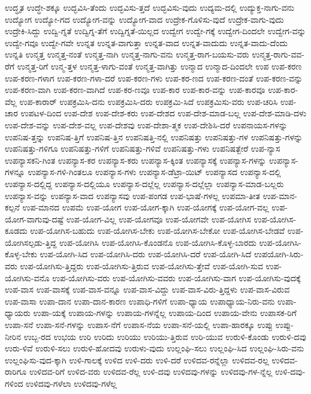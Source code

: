 {ಉದ್ಧೃತ
ಉದ್ಧೇ-ಶಕ್ಕೂ
ಉದ್ಭವಿಸಿ-ತೆಂದು
ಉದ್ಭವಿಸು-ತ್ತದೆ
ಉದ್ಭವಿಸು-ವುದು
ಉದ್ಯಮ-ದಲ್ಲಿ
ಉದ್ಯುಕ್ತ-ನಾಗು-ವನು
ಉದ್ಯೋಗ
ಉದ್ಯೋ-ಗದ
ಉದ್ಯೋಗ-ವನ್ನು
ಉದ್ಯೋಗ-ವಾದ
ಉದ್ರೇಕ-ಗೊಳಿಸು-ವುದೆ
ಉದ್ರೇಕ-ವಾಗು-ವುದು
ಉದ್ರೇಕಿ-ಸಿದ್ದು
ಉದ್ವಿ-ಗ್ನತೆ
ಉದ್ವಿಗ್ನ-ತೆಗೆ
ಉದ್ವಿಗ್ನತೆ-ಯಿಲ್ಲದ
ಉದ್ವೇಗ
ಉದ್ವೇ-ಗಕ್ಕೆ
ಉದ್ವೇಗ-ದಿಂದಲೇ
ಉದ್ವೇಗ-ವನ್ನು
ಉದ್ವೇ-ಗವೂ
ಉದ್ವೇ-ಗವೇ
ಉನ್ನತ
ಉನ್ನತ-ವಾಗುತ್ತಾ
ಉನ್ನತ-ವಾದ
ಉನ್ನತ-ವಾದುದು
ಉನ್ನತ-ವಾದು-ದೆಂದು
ಉನ್ನತಿ
ಉನ್ಮತ್ತ
ಉನ್ಮತ್ತ-ನಂತೆ
ಉನ್ಮತ್ತ-ನಾಗಿ
ಉನ್ಮತ್ತ-ನಾಗು-ವನು
ಉನ್ಮತ್ತ-ರಾಗ-ಬಯಸು-ವರು
ಉನ್ಮತ್ತ-ರಾಗು-ವವ-ರೆಗೆ
ಉನ್ಮತ್ತ-ರಿಗೆ
ಉನ್ಮ-ತ್ತಳ
ಉನ್ಮತ್ತ-ಳಾಗು-ವಂತೆ
ಉನ್ಮತ್ತ-ವಾಗಿತ್ತು
ಉನ್ಮಾದ
ಉನ್ಮಾದ-ದಿಂದಲೇ
ಉಪ
ಉಪ-ಕರಣ
ಉಪ-ಕರಣ-ಗಳಾಗ
ಉಪ-ಕರಣ-ಗಳಾ-ದರೆ
ಉಪ-ಕರಣ-ಗಳು
ಉಪ-ಕರ-ಣದ
ಉಪ-ಕರಣ-ದಂತೆ
ಉಪ-ಕರಣ-ವನ್ನು
ಉಪ-ಕರಣ-ವಾಗಿ
ಉಪ-ಕರಣ-ವಾಗಿದೆ
ಉಪ-ಕರ-ಣವೂ
ಉಪ-ಕಾರ
ಉಪ-ಕಾರ-ವನ್ನು
ಉಪ-ಕಾರವೂ
ಉಪ-ಕಾರ-ವೆಲ್ಲ
ಉಪ-ಕಾರಾರ್
ಉಪಕ್ರಮಿಸಿ-ದನು
ಉಪಕ್ರಮಿಸಿ-ದರು
ಉಪಕ್ರಮಿ-ಸಿದೆ
ಉಪಕ್ರಮಿಸು-ವರು
ಉಪ-ಚರಿಸಿ
ಉಪ-ಚಾರ
ಉಪಟಳ-ದಿಂದ
ಉಪ-ದೇಶ
ಉಪ-ದೇಶ-ಕರು
ಉಪ-ದೇಶದ
ಉಪ-ದೇಶ-ಮಾಡ-ಬಲ್ಲ
ಉಪ-ದೇಶ-ಮಾಡಿ-ದಳು
ಉಪ-ದೇಶ-ವನ್ನು
ಉಪ-ದೇಶ-ವಲ್ಲ
ಉಪ-ದೇಶವು
ಉಪ-ದೇಶಾ-ತ್ಮಕ
ಉಪ-ದೇಶಿಸಿ-ದರೆ
ಉಪನಾಯಸ-ಗಳನ್ನು
ಉಪನಿಷ-ತ್ತನ್ನು
ಉಪನಿಷ-ತ್ತಿಗೆ
ಉಪನಿಷ-ತ್ತಿನ
ಉಪನಿಷತ್ತಿ-ನಲ್ಲಿ
ಉಪನಿಷತ್ತು
ಉಪನಿಷತ್ತು-ಗಳ
ಉಪನಿಷತ್ತು-ಗಳನ್ನು
ಉಪನಿಷತ್ತು-ಗಳಿಗೂ
ಉಪನಿಷತ್ತು-ಗಳಿಗೆ
ಉಪನಿಷತ್ತು-ಗಳಿವೆ
ಉಪನಿಷತ್ತು-ಗಳು
ಉಪನಿಷತ್ಬೇರೆ
ಉಪ-ನ್ಯಾಸ
ಉಪನ್ಯಾಸಕನಿ-ಗಿಂತ
ಉಪನ್ಯಾಸ-ಕರ
ಉಪನ್ಯಾಸ-ಕರು
ಉಪನ್ಯಾಸ-ಕ್ಕಿಂತ
ಉಪನ್ಯಾಸಕ್ಕೆ
ಉಪನ್ಯಾಸ-ಗಳನ್ನು
ಉಪನ್ಯಾಸ-ಗಳನ್ನೂ
ಉಪನ್ಯಾಸ-ಗಳಿ-ಗಿಂತಲೂ
ಉಪನ್ಯಾಸ-ಗಳು
ಉಪನ್ಯಾಸ-ಡೆಟ್ರಾ-ಯಿಟ್
ಉಪನ್ಯಾಸದ
ಉಪನ್ಯಾಸ-ದಲ್ಲಿ
ಉಪನ್ಯಾಸ-ದಲ್ಲಿದ್ದ
ಉಪನ್ಯಾಸ-ದಲ್ಲಿಯೂ
ಉಪನ್ಯಾಸ-ದಲ್ಲೆಲ್ಲ
ಉಪನ್ಯಾಸ-ದಲ್ಲೆಲ್ಲಾ
ಉಪನ್ಯಾಸ-ಮಾಡ-ಬಲ್ಲರು
ಉಪನ್ಯಾಸ-ವನ್ನು
ಉಪನ್ಯಾಸ-ವಾದ
ಉಪನ್ಯಾಸವು
ಉಪ-ಪಂಗಡ
ಉಪ-ಭಾಷೆ-ಗಳಲ್ಲ
ಉಪಮಾ-ತೀತ
ಉಪ-ಮಾನ-ಕಲ್ಪನೆ
ಉಪ-ಮಾನದ
ಉಪಮೆ
ಉಪ-ಯೋಗ
ಉಪ-ಯೋಗ-ಕ್ಕಾಗಿ
ಉಪ-ಯೋಗಕ್ಕೆ
ಉಪ-ಯೋಗ-ವಲ್ಲ
ಉಪ-ಯೋಗ-ವಾಗುವು-ದಷ್ಟೆ
ಉಪ-ಯೋಗ-ವಿಲ್ಲ
ಉಪ-ಯೋಗವೂ
ಉಪ-ಯೋಗವೇ
ಉಪ-ಯೋಗಿಸ
ಉಪ-ಯೋಗಿಸ-ಕೂಡದು
ಉಪ-ಯೋಗಿಸ-ಬಹುದು
ಉಪ-ಯೋಗಿಸ-ಬೇಕು
ಉಪ-ಯೋಗಿಸ-ಬೇಕೋ
ಉಪ-ಯೋಗಿಸ-ಬೇಡವೆ
ಉಪ-ಯೋಗಿಸಲ್ಪಡು-ತ್ತಿದ್ದ
ಉಪ-ಯೋಗಿಸಿ
ಉಪ-ಯೋಗಿಸಿ-ಕೊಂಡನೊ
ಉಪ-ಯೋಗಿಸಿ-ಕೊಳ್ಳ-ಬಾರದು
ಉಪ-ಯೋಗಿಸಿ-ಕೊಳ್ಳ-ಬೇಕು
ಉಪ-ಯೋಗಿ-ಸಿದ
ಉಪ-ಯೋಗಿಸಿ-ದರು
ಉಪ-ಯೋಗಿಸಿ-ದರೆ
ಉಪ-ಯೋಗಿ-ಸಿದೆ
ಉಪಯೋಗಿ-ಸಿರು-ವರು
ಉಪ-ಯೋಗಿಸು-ತ್ತಿದ್ದರು
ಉಪ-ಯೋಗಿಸು-ತ್ತಿರುವ
ಉಪ-ಯೋಗಿಸು-ತ್ತೇವೆ
ಉಪ-ಯೋಗಿ-ಸುವ
ಉಪ-ಯೋಗಿಸು-ವನೊ
ಉಪ-ಯೋಗಿಸು-ವರು
ಉಪ-ಯೋಗಿಸು-ವವರು
ಉಪ-ಯೋಗಿಸು-ವಾಗ
ಉಪ-ಯೋಗಿಸು-ವುದಕ್ಕೆ
ಉಪ-ವಾಸ
ಉಪ-ವಾಸಕ್ಕೆ
ಉಪ-ವಾಸ-ವನ್ನೂ
ಉಪ-ವಾಸ-ವಿದ್ದು
ಉಪ-ವಾಸ-ವಿರು-ತ್ತಿದ್ದಳು
ಉಪ-ವಾಸ-ವಿರುವ
ಉಪ-ವಾಸಾ
ಉಪಾ-ದಾನ
ಉಪಾ-ದಾನ-ಕಾರಣ
ಉಪಾಧಿ-ಗಳಿಗೆ
ಉಪಾ-ಧ್ಯಾಯ
ಉಪಾಧ್ಯಾಯ-ನಿರು-ವನು
ಉಪಾ-ಧ್ಯಾಯರು
ಉಪಾ-ಯಕ್ಕೆ
ಉಪಾಯ-ಗಳನ್ನು
ಉಪಾಯ-ಗಳನ್ನೆಲ್ಲ
ಉಪಾಯ-ದಿಂದ
ಉಪಾಯ-ವೇನು
ಉಪಾಸಕ-ರಿಗೆ
ಉಪಾ-ಸನೆ
ಉಪಾ-ಸನೆ-ಗಳನ್ನು
ಉಪಾಸ-ನೆಗೆ
ಉಪಾಸ-ನೆಯ
ಉಪಾ-ಸನೆ-ಯಲ್ಲಿ
ಉಪಾ-ಹಾರಕ್ಕೂ
ಉಪ್ಪು
ಉಪ್ಪು-ನೀರಿನ
ಉಬ್ಬ-ರದ
ಉಭಯ
ಉರಿ
ಉರಿದು
ಉರಿಯು
ಉರಿಯು-ತ್ತಿರುವ
ಉರಿ-ಯುವ
ಉರುಳಿ-ಕೊಂಡು
ಉರುಳಿ-ದವು
ಉರು-ಳಿವೆ
ಉರುಳಿ-ಸಲು
ಉರುಳಿ-ಹೋದವು
ಉರುಳು-ವುದು
ಉಲ್ಲಂಘಿ-ಸಲು
ಉಲ್ಲಂಘಿ-ಸಿದ
ಉಲ್ಲಂಘಿ-ಸಿರು-ವನು
ಉಲ್ಲಂಘಿಸು-ವುದ-ಕ್ಕಾಗಿ
ಉಳಿ-ಗಾಲಕ್ಕೆ
ಉಳಿದ
ಉಳಿ-ದರು
ಉಳಿ-ದರೆ
ಉಳಿದವ-ರನ್ನೆಲ್ಲಾ
ಉಳಿದವ-ರಲ್ಲ
ಉಳಿದವ-ರಾರಿಗೂ
ಉಳಿದವ-ರಿಗೆ
ಉಳಿದ-ವರು
ಉಳಿದವ-ರೆಲ್ಲ
ಉಳಿ-ದವು
ಉಳಿದವು-ಗಳನ್ನು
ಉಳಿದವು-ಗಳ-ನ್ನೆಲ್ಲ
ಉಳಿ-ದವು-ಗಳಿಂದ
ಉಳಿದವು-ಗಳೆಲಾ
ಉಳಿದವು-ಗಳೆಲ್ಲ
}
